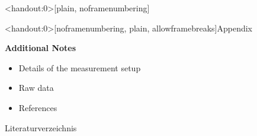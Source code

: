 \documentclass[handout]{beamer} %
\begin{document}
    \begin{frame}<handout:0>[plain, noframenumbering]
    \end{frame}

    \begin{frame}<handout:0>[noframenumbering, plain, allowframebreaks]{Appendix}
      \begin{minipage}{0.4\textwidth}
        \textbf{Additional Notes}
        \begin{itemize}
          \item Details of the measurement setup
          \item Raw data
          \item References
        \end{itemize}
      \end{minipage}
      \hfill
      \begin{minipage}{0.58\textwidth}
      \end{minipage}
    \end{frame}

    \begin{frame}{Literaturverzeichnis}
   \printbibliography%
    \end{frame}
\end{document}
